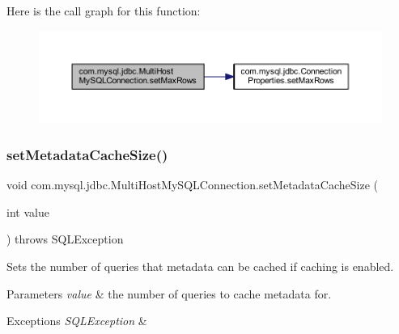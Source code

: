 Here is the call graph for this function\+:
\nopagebreak
\begin{figure}[H]
\begin{center}
\leavevmode
\includegraphics[width=350pt]{classcom_1_1mysql_1_1jdbc_1_1_multi_host_my_s_q_l_connection_a15920ec9b291f698817ea82c8ecabfbe_cgraph}
\end{center}
\end{figure}
\mbox{\label{classcom_1_1mysql_1_1jdbc_1_1_multi_host_my_s_q_l_connection_a2403357756bbbdea09d2773f42ea3501}} 
\subsubsection{\texorpdfstring{set\+Metadata\+Cache\+Size()}{setMetadataCacheSize()}}
{\footnotesize\ttfamily void com.\+mysql.\+jdbc.\+Multi\+Host\+My\+S\+Q\+L\+Connection.\+set\+Metadata\+Cache\+Size (\begin{DoxyParamCaption}\item[{int}]{value }\end{DoxyParamCaption}) throws S\+Q\+L\+Exception}

Sets the number of queries that metadata can be cached if caching is enabled.


\begin{DoxyParams}{Parameters}
{\em value} & the number of queries to cache metadata for. \\
\hline
\end{DoxyParams}

\begin{DoxyExceptions}{Exceptions}
{\em S\+Q\+L\+Exception} & \\
\hline
\end{DoxyExceptions}


